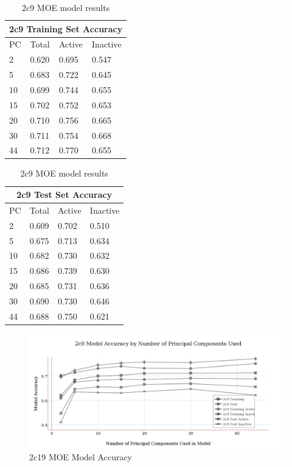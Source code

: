 \begin{table}[!h]
\begin{minipage}{.5\linewidth}
\centering
\begin{tabular}{|l|l|l|l|}
\hline
\multicolumn{4}{|c|}{2c9 Training Set Accuracy} \\ \hline
PC & Total          & Active          & Inactive\\ \hline
2  & 0.620          & 0.695           & 0.547   \\ \hline
5  & 0.683          & 0.722           & 0.645   \\ \hline
10 & 0.699          & 0.744           & 0.655   \\ \hline
15 & 0.702          & 0.752           & 0.653   \\ \hline
20 & 0.710          & 0.756           & 0.665   \\ \hline
30 & 0.711          & 0.754           & 0.668   \\ \hline
44 & 0.712          & 0.770           & 0.655   \\ \hline
\end{tabular}
\end{minipage}
\begin{minipage}{.5\linewidth}
\centering
\begin{tabular}{|l|l|l|l|}
\hline
\multicolumn{4}{|c|}{2c9 Test Set Accuracy}     \\ \hline
PC & Total          & Active          & Inactive\\ \hline
2  & 0.609          & 0.702           & 0.510   \\ \hline
5  & 0.675          & 0.713           & 0.634   \\ \hline
10 & 0.682          & 0.730           & 0.632   \\ \hline
15 & 0.686          & 0.739           & 0.630   \\ \hline
20 & 0.685          & 0.731           & 0.636   \\ \hline
30 & 0.690          & 0.730           & 0.646   \\ \hline
44 & 0.688          & 0.750           & 0.621   \\ \hline
\end{tabular}
\end{minipage}
\caption{2c9 MOE model results}
\end{table}

\begin{figure}[!h]
\includegraphics[width=1\textwidth]{../img/2c9_moe_model_accuracy.png}
\caption{2c19 MOE Model Accuracy}
\end{figure}

